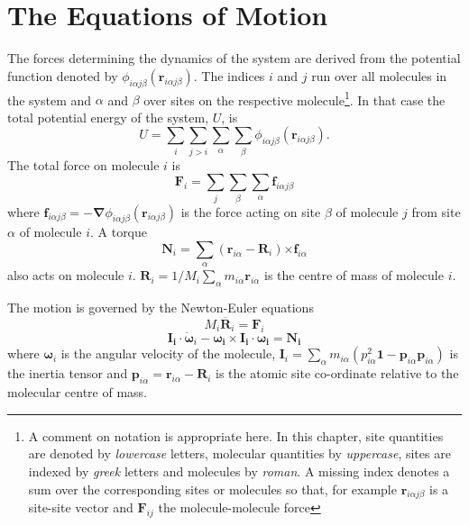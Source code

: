 \section{The Equations of Motion}
The forces determining the dynamics of the system are derived from the
potential    function    denoted     by   $\phi_{i\alpha  j\beta}(\bm{r}
_{i\alpha j\beta})$.  The indices $i$ and $j$ run  over all molecules
in the system and  $\alpha$ and $\beta$ over  sites on  the respective
molecule\footnote{A comment on notation is appropriate here.  In this
chapter, site quantities are denoted by {\em lowercase} letters,
molecular quantities by {\em uppercase}, sites are indexed by {\em greek}
letters and molecules by {\em roman}. A missing index denotes
a sum over the corresponding sites or molecules so that, for example
$\bm{r}_{i\alpha j\beta}$ is a site-site vector and $\bm{F}_{ij}$ the
molecule-molecule force}.  
In that case the total potential energy of the system, $U$, is
\begin{equation}
U = \sum_i \sum_{j > i} \sum_\alpha \sum_\beta \phi_{i\alpha j\beta}(
\bm{r}_{i\alpha j\beta}).
\end{equation}
The total force on molecule $i$ is
\begin{equation}
\bm{F}_i = \sum_j \sum_\beta \sum_\alpha \bm{f}_{i\alpha j\beta}
\end{equation}
where $\bm{f}_{i\alpha j\beta} = - \bm{\nabla} \phi_{i\alpha  j\beta}(
\bm{r}_{i\alpha j\beta})$ is the force acting on site $\beta$ of molecule
$j$ from site $\alpha$ of molecule $i$.  A torque
\begin{equation}
\bm{N}_i = \sum_\alpha (\bm{r}_{i \alpha} - \bm{R}_{i}) 
\bm{\times f}_{i\alpha} 
\end{equation}
also acts on molecule $i$.  $\bm{R}_{i} = 1/M_i \sum_\alpha
m_{i\alpha} \bm{r}_{i\alpha}$ is the centre of mass of molecule $i$.

The motion is governed by the Newton-Euler equations
\begin{equation}
M_i\ddot{\bm{R}_i} = \bm{F}_i
\end{equation}
\begin{equation}
\bm{I_i \cdot} \dot{\bm{\omega}}_i - \bm{\omega_i \times I_i \cdot
\omega_i} = \bm{N_i} \label{eqn:euler}
\end{equation}
where  $\bm{\omega}_i$ is the angular velocity of the molecule, 
$ \bm{I}_i = \sum_{\alpha} m_{i\alpha} 
( p_{i\alpha}^2 \bm{1} - \bm{p}_{i\alpha}\bm{p}_{i\alpha} ) $ 
is the inertia tensor and 
$\bm{p}_{i\alpha} = \bm{r}_{i\alpha} - \bm{R}_i $
is the atomic site co-ordinate relative to the molecular centre of mass.

